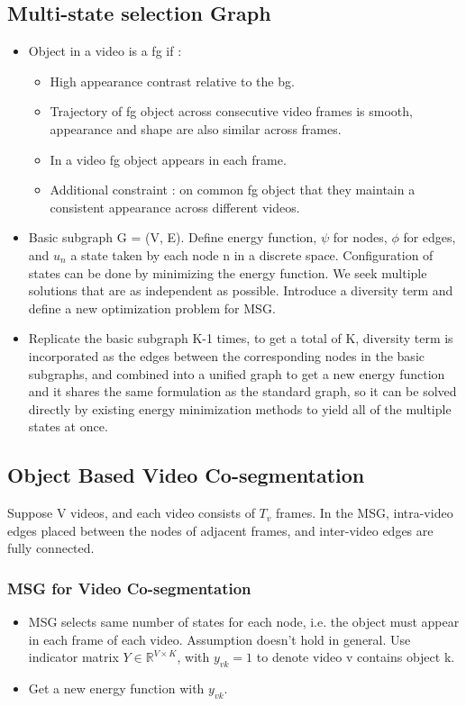 \documentclass{article}
\begin{document}
\subsection{Multi-state selection Graph}
\begin{itemize}
\item Object in a video is a fg if :
  \begin{itemize}
  \item High appearance contrast relative to the bg.
  \item Trajectory of fg object across consecutive video frames is smooth, appearance and shape are also similar across frames.
  \item In a video fg object appears in each frame.
  \item Additional constraint : on common fg object that they maintain a consistent appearance across different videos.
  \end{itemize}
\item Basic subgraph G = (V, E). Define energy function, $\psi$ for nodes, $\phi$ for edges, and $u_n$ a state taken by each node n in a discrete space. Configuration of states can be done by minimizing the energy function. We seek multiple solutions that are as independent as possible. Introduce a diversity term and define a new optimization problem for MSG.
\item Replicate the basic subgraph K-1 times, to get a total of K, diversity term is incorporated as the edges between the corresponding nodes in the basic subgraphs, and combined into a unified graph to get a new energy function and it shares the same formulation as the standard graph, so it can be solved directly by existing energy minimization methods to yield all of the multiple states at once.
\end{itemize}

\subsection{Object Based Video Co-segmentation}
Suppose V videos, and each video consists of $T_v$ frames. In the MSG, intra-video edges placed between the nodes of adjacent frames, and inter-video edges are fully connected.

\subsubsection{MSG for Video Co-segmentation}
\begin{itemize}
\item MSG selects same number of states for each node, i.e. the object must appear in each frame of each video. Assumption doesn't hold in general. Use indicator matrix $Y \in \mathbb{R}^{V \times K}$, with $y_{vk} = 1$ to denote video v contains object k.
\item Get a new energy function with $y_{vk}$.
\end{itemize}
\end{document}
